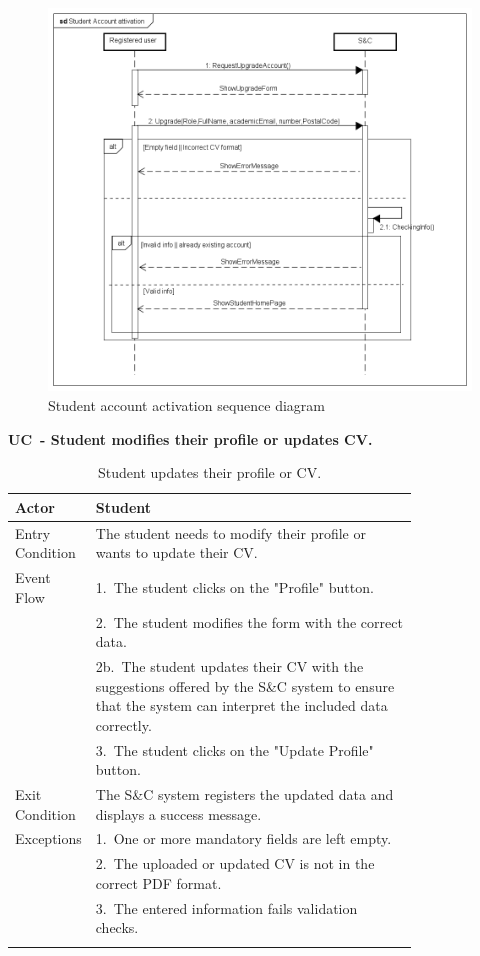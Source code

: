\begin{figure}[H]
    \centering
    \includegraphics[width=1\linewidth]{Images/Sequence diagrams/Student account attivation.png}
    \caption{Student account activation sequence diagram}
    \label{fig:enter-label}
\end{figure}

\textbf{UC\cuc\  - Student modifies their profile or updates CV.}

\begin{center}
    \renewcommand{\arraystretch}{1.2}
    \begin{longtable}{ l p{0.8\linewidth} } 
        \hline
        Actor & Student \\ \hline
        Entry Condition & The student needs to modify their profile or wants to update their CV. \\ \hline
        Event Flow & 1.\ The student clicks on the "Profile" button. \\
        & 2.\ The student modifies the form with the correct data. \\
        & 2b.\ The student updates their CV with the suggestions offered by the S\&C system to ensure that the system can interpret the included data correctly. \\ 
        & 3.\ The student clicks on the "Update Profile" button. \\ \hline
        Exit Condition & The S\&C system registers the updated data and displays a success message. \\ \hline
        Exceptions & 1.\ One or more mandatory fields are left empty. \\ 
        & 2.\ The uploaded or updated CV is not in the correct PDF format. \\ 
        & 3.\ The entered information fails validation checks. \\ \hline
        \caption{Student updates their profile or CV.}
        \label{tab:student_profile_update_uc}%
    \end{longtable}
\end{center}

